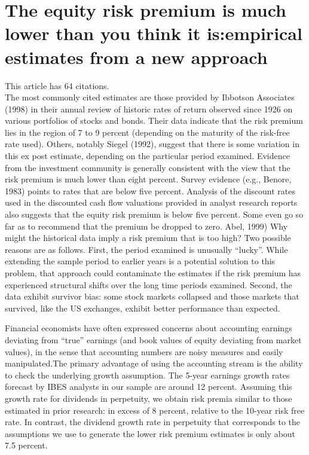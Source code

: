 \documentclass[12 pt]{article}
\begin{document}
\section{The equity risk premium is much lower than you think it is:empirical estimates from a new approach}
This article has 64 citations.\\
The most commonly cited estimates are those provided by Ibbotson Associates (1998) in their annual review of historic rates of return observed since 1926 on various portfolios of stocks and bonds. Their data indicate that the risk premium lies in the region of 7 to 9 percent (depending on the maturity of the risk-free rate used). Others, notably Siegel (1992), suggest that there is some variation in this ex post estimate, depending on the particular period examined. Evidence from the investment community is generally consistent with the view that the risk premium is much lower than eight percent. Survey evidence (e.g., Benore, 1983) points to rates that are below five percent. Analysis of the discount rates used in the discounted cash flow valuations provided in analyst research reports also suggests that the equity risk premium is below five percent. Some even go so far as to recommend that the premium be dropped to zero. Abel, 1999)
Why might the historical data imply a risk premium that is too high? Two possible reasons are as follows. First, the period examined is unusually “lucky”. While extending the sample period to earlier years is a potential solution to this problem, that approach could contaminate the estimates if the risk premium has experienced structural shifts over the long time periods examined. Second, the data exhibit survivor bias: some stock markets collapsed and those markets that survived, like the US exchanges, exhibit better performance than expected.
\par Financial economists have often expressed concerns about accounting earnings deviating from “true” earnings (and book values of equity deviating from market values), in the sense that accounting numbers are noisy measures and easily manipulated.The
primary advantage of using the accounting stream is the ability to check the underlying growth assumption. The 5-year earnings growth rates forecast by IBES analysts in our sample are around 12 percent. Assuming this growth rate for dividends in perpetuity, we obtain risk premia similar to those estimated in prior research: in excess of 8 percent, relative to the 10-year risk free rate. In contrast, the dividend growth rate in perpetuity that corresponds to the assumptions we use to generate the lower risk premium estimates is only about 7.5 percent.
\end{document}
